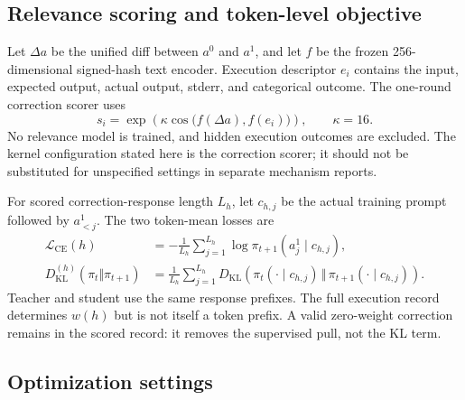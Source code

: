 \documentclass{article}
\begin{document}
\subsection{Relevance scoring and token-level objective}

Let $\Delta a$ be the unified diff between $a^0$ and $a^1$, and let $f$ be the frozen 256-dimensional signed-hash text encoder. Execution descriptor $e_i$ contains the input, expected output, actual output, stderr, and categorical outcome. The one-round correction scorer uses
\begin{equation}
s_i=\exp\!\left(\kappa\cos\bigl(f(\Delta a),f(e_i)\bigr)\right),
\qquad \kappa=16.
\label{eq:relevance-kernel}
\end{equation}
No relevance model is trained, and hidden execution outcomes are excluded. The kernel configuration stated here is the correction scorer; it should not be substituted for unspecified settings in separate mechanism reports.

For scored correction-response length $L_h$, let $c_{h,j}$ be the actual training prompt followed by $a^1_{<j}$. The two token-mean losses are
\begin{align}
\mathcal L_{\mathrm{CE}}(h)
&=-\frac{1}{L_h}\sum_{j=1}^{L_h}
\log\pi_{t+1}(a^1_j\mid c_{h,j}),\\
D_{\mathrm{KL}}^{(h)}(\pi_t\Vert\pi_{t+1})
&=\frac{1}{L_h}\sum_{j=1}^{L_h}
D_{\mathrm{KL}}\!\left(
\pi_t(\cdot\mid c_{h,j})\,\Vert\,
\pi_{t+1}(\cdot\mid c_{h,j})
\right).
\end{align}
Teacher and student use the same response prefixes. The full execution record determines $w(h)$ but is not itself a token prefix. A valid zero-weight correction remains in the scored record: it removes the supervised pull, not the KL term.

\subsection{Optimization settings}
\end{document}
